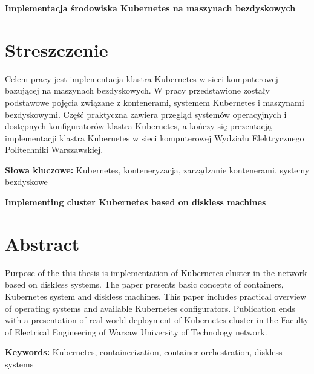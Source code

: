 \newpage
\begin{center}
  \large \bf
  Implementacja środowiska Kubernetes na maszynach bezdyskowych
\end{center}

\section*{Streszczenie}

Celem pracy jest implementacja klastra Kubernetes w sieci komputerowej bazującej
na maszynach bezdyskowych.
W pracy przedstawione zostały podstawowe pojęcia związane z kontenerami,
systemem Kubernetes i maszynami bezdyskowymi.
Część praktyczna zawiera przegląd systemów operacyjnych i dostępnych
konfiguratorów klastra Kubernetes, a kończy się prezentacją implementacji
klastra Kubernetes w sieci komputerowej
Wydziału Elektrycznego Politechniki Warszawskiej.

\bigskip
{\noindent\bf Słowa kluczowe:} Kubernetes, konteneryzacja, zarządzanie kontenerami, systemy bezdyskowe

\vskip 2cm


\begin{center}
  \large \bf
  Implementing cluster Kubernetes based on diskless machines
\end{center}

\section*{Abstract}

Purpose of the this thesis is implementation of Kubernetes cluster in
the network based on diskless systems.
The paper presents basic concepts of containers, Kubernetes system and
diskless machines.
This paper includes practical overview of operating systems and available
Kubernetes configurators. Publication ends with a presentation of
real world deployment of Kubernetes cluster in the
Faculty of Electrical Engineering of Warsaw University of Technology
network.

\bigskip
{\noindent\bf Keywords:} Kubernetes, containerization, container orchestration, diskless systems

\vfill
